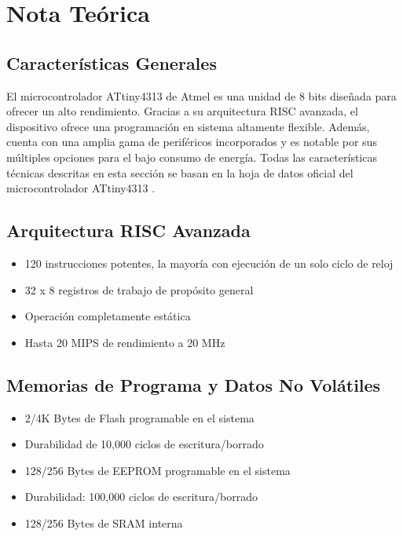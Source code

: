 \section{Nota Teórica}
\subsection{Características Generales}
El microcontrolador ATtiny4313 de Atmel es una unidad de 8 bits diseñada para ofrecer un alto rendimiento. Gracias a su arquitectura RISC avanzada, el dispositivo ofrece una programación en sistema altamente flexible. Además, cuenta con una amplia gama de periféricos incorporados y es notable por sus múltiples opciones para el bajo consumo de energía. Todas las características técnicas descritas en esta sección se basan en la hoja de datos oficial del microcontrolador ATtiny4313 \cite{Atmel2011}.

\subsection{Arquitectura RISC Avanzada}
\begin{itemize}
    \item 120 instrucciones potentes, la mayoría con ejecución de un solo ciclo de reloj
    \item 32 x 8 registros de trabajo de propósito general
    \item Operación completamente estática
    \item Hasta 20 MIPS de rendimiento a 20 MHz
\end{itemize}

\subsection{Memorias de Programa y Datos No Volátiles}
\begin{itemize}
    \item 2/4K Bytes de Flash programable en el sistema
    \item Durabilidad de 10,000 ciclos de escritura/borrado
    \item 128/256 Bytes de EEPROM programable en el sistema
    \item Durabilidad: 100,000 ciclos de escritura/borrado
    \item 128/256 Bytes de SRAM interna
\end{itemize}

